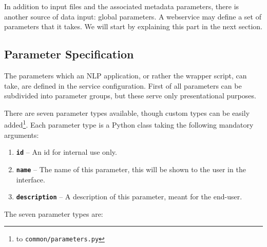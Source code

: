 \documentclass[a4paper,12pt]{report}
\begin{document}
In addition to input files and the associated metadata parameters, there is
another source of data input: global parameters. A webservice may define a set
of parameters that it takes. We will start by explaining this part in the next
section.


\subsection{Parameter Specification}
\label{sec:parameters}

The parameters which an NLP application, or rather the wrapper script, can
take, are defined in the service configuration. First of all parameters can be
subdivided into parameter groups, but these serve only presentational purposes. 

There are seven parameter types available, though custom types can be easily
added\footnote{to \texttt{common/parameters.py}}. Each parameter type is a
Python class taking the following mandatory arguments:

\begin{enumerate}
\item \textbf{\texttt{id}} -- An id for internal use only.
\item \textbf{\texttt{name}} -- The name of this parameter, this will be shown to the user in the interface.
\item \textbf{\texttt{description}} -- A description of this parameter, meant for the end-user.
\end{enumerate}

The seven parameter types are:
\end{document}
